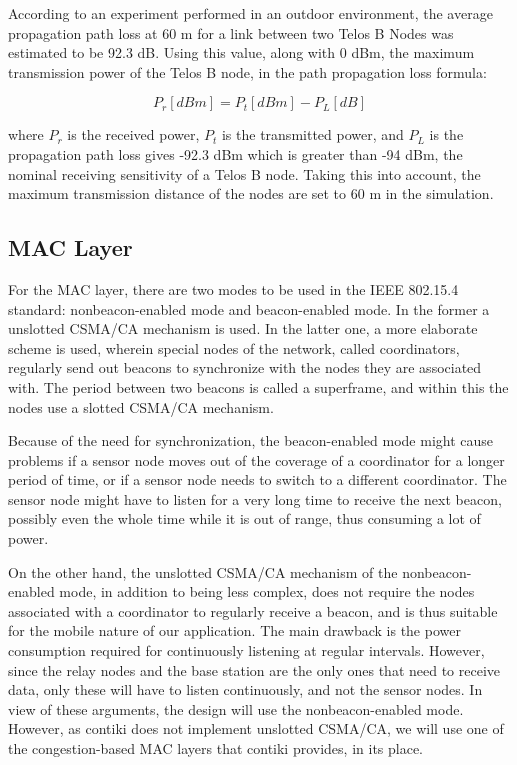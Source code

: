 \documentclass[conference]{IEEEtran}
\begin{document}
According to an experiment performed in an outdoor environment, the average
propagation path loss at 60 m for a link between two Telos B Nodes was
estimated to be 92.3 dB. Using this value, along with 0 dBm, the maximum
transmission power of the Telos B node, in the path propagation loss formula:

\begin{displaymath}
    P_{r}[dBm] = P_{t}[dBm] - P_{L}[dB]
\end{displaymath}

where $P_{r}$ is the received power, $P_{t}$ is the transmitted power, and
$P_{L}$ is the propagation path loss gives -92.3 dBm which is greater than -94
dBm, the nominal receiving sensitivity of a Telos B node. Taking this into
account, the maximum transmission distance of the nodes are set to 60 m in the
simulation.

\subsection{MAC Layer}

For the MAC layer, there are two modes to be used in the IEEE 802.15.4
standard: nonbeacon-enabled mode and beacon-enabled mode. In the former
a unslotted CSMA/CA mechanism is used. In the latter one, a more elaborate
scheme is used, wherein special nodes of the network, called coordinators,
regularly send out beacons to synchronize with the nodes they are associated
with. The period between two beacons is called a superframe, and within this
the nodes use a slotted CSMA/CA mechanism.

Because of the need for synchronization, the beacon-enabled mode might cause
problems if a sensor node moves out of the coverage of a coordinator for
a longer period of time, or if a sensor node needs to switch to a different
coordinator.  The sensor node might have to listen for a very long time to
receive the next beacon, possibly even the whole time while it is out of range,
thus consuming a lot of power.

On the other hand, the unslotted CSMA/CA mechanism of the nonbeacon-enabled
mode, in addition to being less complex, does not require the nodes associated
with a coordinator to regularly receive a beacon, and is thus suitable for the
mobile nature of our application. The main drawback is the power consumption
required for continuously listening at regular intervals.  However, since the
relay nodes and the base station are the only ones that need to receive data,
only these will have to listen continuously, and not the sensor nodes. In view
of these arguments, the design will use the nonbeacon-enabled mode. However, as
contiki does not implement unslotted CSMA/CA, we will use one of the
congestion-based MAC layers that contiki provides, in its place.
\end{document}
